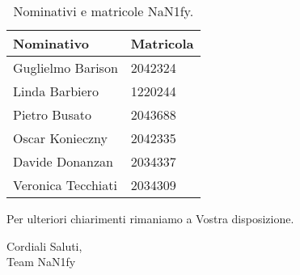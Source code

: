 \begin{table}[ht!]
		\centering
		\begin{tabular}{p{3cm} p{3cm}}
			\toprule
			\textbf{Nominativo} & \textbf{Matricola} \\
			\midrule
			Guglielmo Barison & 2042324 \\
			Linda Barbiero &  1220244 \\
			Pietro Busato & 2043688 \\
			Oscar Konieczny & 2042335 \\
			Davide Donanzan & 2034337 \\
			Veronica Tecchiati & 2034309 \\
			\bottomrule
		\end{tabular}
		\caption{Nominativi e matricole NaN1fy.}
		\label{table:Nominativi e matricole NaN1fy}
\end{table}
Per ulteriori chiarimenti rimaniamo a Vostra disposizione.
\vspace{1em}
\begin{flushleft}
	Cordiali Saluti,\\
	Team NaN1fy
\end{flushleft}